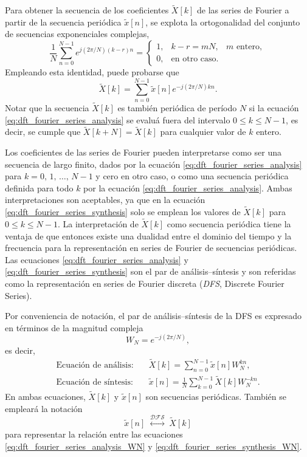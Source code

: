 \documentclass[a4paper]{report}
\begin{document}
Para obtener la secuencia de los coeficientes \(\tilde{X}[k]\) de las series de Fourier a partir de la secuencia periódica \(\tilde{x}[n]\), se explota la ortogonalidad del conjunto de secuencias exponenciales complejas,
\[
 \frac{1}{N}\sum_{n=0}^{N-1}e^{j(2\pi/N)(k-r)n}=
 \left\{ 
  \begin{array}{lll}
   1, &k-r=mN, &m\textrm{ entero}, \\
   0, &\textrm{en otro caso}.
  \end{array}
 \right.
\]
Empleando esta identidad, puede probarse que 
\begin{equation}\label{eq:dft_fourier_series_analysis}
 \tilde{X}[k]=\sum_{n=0}^{N-1}\tilde{x}[n]e^{-j(2\pi/N)kn}.
\end{equation}
Notar que la secuencia \(\tilde{X}[k]\) es también periódica de período \(N\) si la ecuación \ref{eq:dft_fourier_series_analysis} se evaluá fuera del intervalo \(0\leq k\leq N-1\), es decir, se cumple que \(\tilde{X}[k+N]=\tilde{X}[k]\) para cualquier valor de \(k\) entero.

Los coeficientes de las series de Fourier pueden interpretarse como ser una secuencia de largo finito, dados por la ecuación \ref{eq:dft_fourier_series_analysis} para \(k=0,\,1,\,\dots,\,N-1\) y cero en otro caso, o como una secuencia periódica definida para todo \(k\) por la ecuación \ref{eq:dft_fourier_series_analysis}. Ambas interpretaciones son aceptables, ya que en la ecuación \ref{eq:dft_fourier_series_synthesis} solo se emplean los valores de \(\tilde{X}[k]\) para \(0\leq k\leq N-1\). La interpretación de \(\tilde{X}[k]\) como secuencia periódica tiene la ventaja de que entonces existe una dualidad entre el dominio del tiempo y la frecuencia para la representación en series de Fourier de secuencias periódicas. Las ecuaciones \ref{eq:dft_fourier_series_analysis} y \ref{eq:dft_fourier_series_synthesis} son el par de análisis--síntesis y son referidas como la representación en series de Fourier discreta (\emph{DFS}, Discrete Fourier Series).

Por conveniencia de notación, el par de análisis--síntesis de la DFS es expresado en términos de la magnitud compleja
\[
 W_N=e^{-j(2\pi/N)},
\]
es decir,
\begin{align}
 \textrm{Ecuación de análisis:}&\quad\tilde{X}[k]=\sum_{n=0}^{N-1}\tilde{x}[n]W_N^{kn},\label{eq:dft_fourier_series_analysis_WN}\\
 \textrm{Ecuación de síntesis:}&\quad\tilde{x}[n]=\frac{1}{N}\sum_{k=0}^{N-1}\tilde{X}[k]W_N^{-kn}\label{eq:dft_fourier_series_synthesis_WN}.
\end{align}
En ambas ecuaciones, \(\tilde{X}[k]\) y \(\tilde{x}[n]\) son secuencias periódicas. También se empleará la notación
\[
 \tilde{x}[n]\;\overset{\mathcal{DFS}}{\longleftrightarrow}\;\tilde{X}[k]
\]
para representar la relación entre las ecuaciones \ref{eq:dft_fourier_series_analysis_WN} y \ref{eq:dft_fourier_series_synthesis_WN}.
\end{document}
